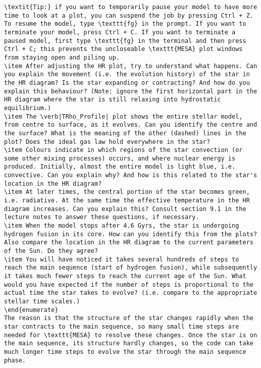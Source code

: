 \documentclass[11pt,a4paper]{article}
\begin{document}
\begin{lstlisting}
\textit{Tip:} if you want to temporarily pause your model to have more time to look at a plot, you can suspend the job by pressing Ctrl + Z. To resume the model, type \texttt{fg} in the prompt. If you want to terminate your model, press Ctrl + C. If you want to terminate a paused model, first type \texttt{fg} in the terminal and then press Ctrl + C; this prevents the uncloseable \texttt{MESA} plot windows from staying open and piling up. 
\item After adjusting the HR plot, try to understand what happens. Can you explain the movement (i.e. the evolution history) of the star in the HR diagram? Is the star expanding or contracting? And how do you explain this behaviour? (Note: ignore the first horizontal part in the HR diagram where the star is still relaxing into hydrostatic equilibrium.)
\item The \verb|TRho_Profile| plot shows the entire stellar model, from centre to surface, as it evolves. Can you identify the centre and the surface? What is the meaning of the other (dashed) lines in the plot? Does the ideal gas law hold everywhere in the star?
\item Colours indicate in which regions of the star convection (or some other mixing processes) occurs, and where nuclear energy is produced. Initially, almost the entire model is light blue, i.e. convective. Can you explain why? And how is this related to the star's location in the HR diagram?
\item At later times, the central portion of the star becomes green, i.e. radiative. At the same time the effective temperature in the HR diagram increases. Can you explain this? Consult section 9.1 in the lecture notes to answer these questions, if necessary.
\item When the model stops after 4.6 Gyrs, the star is undergoing hydrogen fusion in its core. How can you identify this from the plots? Also compare the location in the HR diagram to the current parameters of the Sun. Do they agree?
\item You will have noticed it takes several hundreds of steps to reach the main sequence (start of hydrogen fusion), while subsequently it takes much fewer steps to reach the current age of the Sun. What would you have expected if the number of steps is proportional to the actual time the star takes to evolve? (i.e. compare to the appropriate stellar time scales.)
\end{enumerate}
The reason is that the structure of the star changes rapidly when the star contracts to the main sequence, so many small time steps are needed for \texttt{MESA} to resolve these changes. Once the star is on the main sequence, its structure hardly changes, so the code can take much longer time steps to evolve the star through the main sequence phase.


\end{lstlisting}
\end{document}
